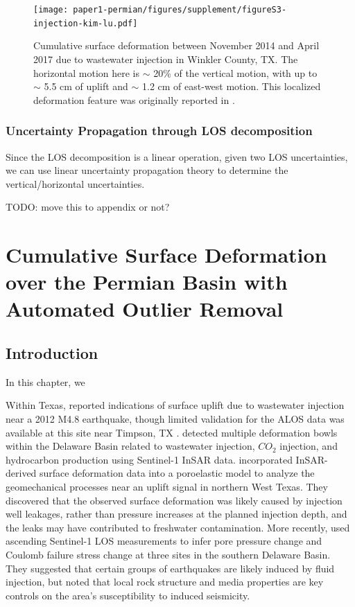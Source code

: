 \documentclass{utexasthesis}
\begin{document}
\begin{figure}
	\centering
	\texttt{[image: paper1-permian/figures/supplement/figureS3-injection-kim-lu.pdf]}
	\caption[Vertical and horizontal deformation near Winkler County, TX]{Cumulative surface deformation between November 2014 and April 2017 due to wastewater injection in Winkler County, TX. The horizontal motion here is $\sim$ 20\% of the vertical motion, with up to $\sim$ 5.5 cm of uplift and $\sim$ 1.2 cm of east-west motion. This localized deformation feature was originally reported in \cite{Kim2018AssociationLocalizedGeohazards}.}
	\label{fig:injection-kim-lu}
\end{figure}




\subsection{Uncertainty Propagation through LOS decomposition}
\label{sec:ch3-decomp-uq-prop}
Since the LOS decomposition is a linear operation, given two LOS uncertainties, we can use linear uncertainty propagation theory to determine the vertical/horizontal uncertainties.

TODO: move this to appendix or not?





\chapter{Cumulative Surface Deformation over the Permian Basin with Automated Outlier Removal}
\label{CHAP:4-GRL}

\section{Introduction}


In this chapter, we 

Within Texas, \cite{Shirzaei2016SurfaceUpliftTime} reported indications of surface uplift due to wastewater injection near a 2012 M4.8 earthquake, though limited validation for the ALOS data was available at this site near Timpson, TX \cite{Semple2017IncompleteInventorySuspected}. \cite{Kim2018AssociationLocalizedGeohazards} detected multiple deformation bowls within the Delaware Basin related to wastewater injection, $CO_2$ injection, and hydrocarbon production using Sentinel-1 InSAR data. \cite{Zheng2019WastewaterLeakageWest} incorporated InSAR-derived surface deformation data into a poroelastic model to analyze the geomechanical processes near an uplift signal in northern West Texas. They discovered that the observed surface deformation was likely caused by injection well leakages, rather than pressure increases at the planned injection depth, and the leaks may have contributed to freshwater contamination. More recently, \cite{Deng2020SurfaceDeformationInduced} used ascending Sentinel-1 LOS measurements to infer pore pressure change and Coulomb failure stress change at three sites in the southern Delaware Basin. They suggested that certain groups of earthquakes are likely induced by fluid injection, but noted that local rock structure and media properties are key controls on the area's susceptibility to induced seismicity.
\end{document}
